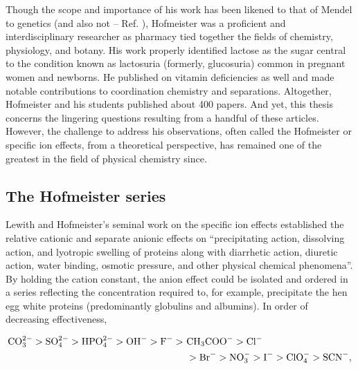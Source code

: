 \begin{intro}
   Though the scope and importance of his work has been likened to that of Mendel to genetics\cite{kunz2004translation} (and also not -- Ref. \cite{jungwirth2014beyond}), 
   Hofmeister was a proficient and interdisciplinary researcher as pharmacy tied together the fields of chemistry, physiology, and botany\cite{abernethy1967franz}. His work 
   properly identified lactose as the sugar central to the condition known as lactosuria (formerly, glucosuria) common in pregnant women and newborns\cite{abernethy1967franz}. 
   He published on vitamin deficiencies as well and made notable contributions to coordination chemistry and separations\cite{abernethy1967franz}. Altogether, Hofmeister and 
   his students published about 400 papers\cite{abernethy1967franz}. And yet, this thesis concerns the lingering questions resulting from a handful of these articles. However, 
   the challenge to address his observations, often called the Hofmeister or specific ion effects, from a theoretical perspective, has remained one of the greatest in the field 
   of physical chemistry since.
   
   \subsection{\label{ch1:sec1:level2}The Hofmeister series}
    Lewith and Hofmeister's seminal work on the specific ion effects established the relative cationic and separate anionic effects on ``precipitating action, dissolving action, 
    and lyotropic swelling of proteins along with diarrhetic action, diuretic action, water binding, osmotic pressure, and other physical chemical phenomena''\cite{abernethy1967franz}.
    By holding the cation constant, the anion effect could be isolated and ordered in a series reflecting the concentration required to, for example, precipitate the hen egg white
    proteins (predominantly globulins and albumins). In order of decreasing effectiveness,
    
    \begin{equation}\label{hof1}
     \begin{split}
     \text{CO}^{\mathrm{2-}}_{\mathrm{3}} > \text{SO}^{\mathrm{2-}}_{\mathrm{4}} > \text{HPO}^{\mathrm{2-}}_{\mathrm{4}} > \text{OH}^{-} > \text{F}^{-} >~&\text{CH}_{\mathrm{3}}\text{COO}^{-} > \text{Cl}^{-} \\
                              &> \text{Br}^{-} > \text{NO}^{\mathrm{-}}_{\mathrm{3}} > \text{I}^{-} > \text{ClO}^{\mathrm{-}}_{\mathrm{4}} > \text{SCN}^{-},
     \end{split}
    \end{equation}
    

\end{intro}
